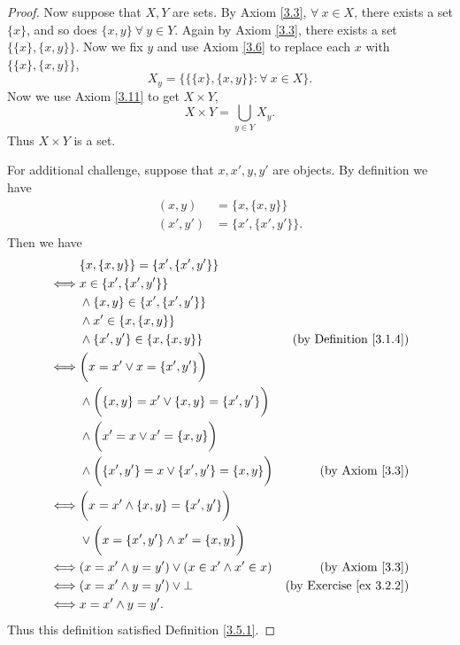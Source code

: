 \begin{proof}
    Now suppose that \(X, Y\) are sets.
    By Axiom \ref{3.3}, \(\forall\ x \in X\), there exists a set \(\{x\}\), and so does \(\{x, y\} \ \forall\ y \in Y\).
    Again by Axiom \ref{3.3}, there exists a set \(\{\{x\}, \{x, y\}\}\).
    Now we fix \(y\) and use Axiom \ref{3.6} to replace each \(x\) with \(\{\{x\}, \{x, y\}\}\),
    \[
        X_y = \{\{\{x\}, \{x, y\}\} : \forall\ x \in X\}.
    \]
    Now we use Axiom \ref{3.11} to get \(X \times Y\),
    \[
        X \times Y = \bigcup_{y \in Y} X_y.
    \]
    Thus \(X \times Y\) is a set.

    For additional challenge, suppose that \(x, x', y, y'\) are objects.
    By definition we have
    \begin{align*}
        (x, y)   & = \{x, \{x, y\}\}     \\
        (x', y') & = \{x', \{x', y'\}\}.
    \end{align*}
    Then we have
    \begin{align*}
             & \{x, \{x, y\}\} = \{x', \{x', y'\}\}                                                              \\
        \iff & x \in \{x', \{x', y'\}\}                                                                          \\
             & \land \{x, y\} \in \{x', \{x', y'\}\}                                                             \\
             & \land x' \in \{x, \{x, y\}\}                                                                      \\
             & \land \{x', y'\} \in \{x, \{x, y\}\}                        & \text{(by Definition \ref{3.1.4})}  \\
        \iff & \bigg(x = x' \lor x = \{x', y'\}\bigg)                                                            \\
             & \land \bigg(\{x, y\} = x' \lor \{x, y\} = \{x', y'\}\bigg)                                        \\
             & \land \bigg(x' = x \lor x' = \{x, y\}\bigg)                                                       \\
             & \land \bigg(\{x', y'\} = x \lor \{x', y'\} = \{x, y\}\bigg) & \text{(by Axiom \ref{3.3})}         \\
        \iff & \bigg(x = x' \land \{x, y\} = \{x', y'\}\bigg)                                                    \\
             & \lor \bigg(x = \{x', y'\} \land x' = \{x, y\}\bigg)                                               \\
        \iff & (x = x' \land y = y') \lor (x \in x' \land x' \in x)        & \text{(by Axiom \ref{3.3})}         \\
        \iff & (x = x' \land y = y') \lor \bot                             & \text{(by Exercise \ref{ex 3.2.2})} \\
        \iff & x = x' \land y = y'.
    \end{align*}
    Thus this definition satisfied Definition \ref{3.5.1}.
\end{proof}

